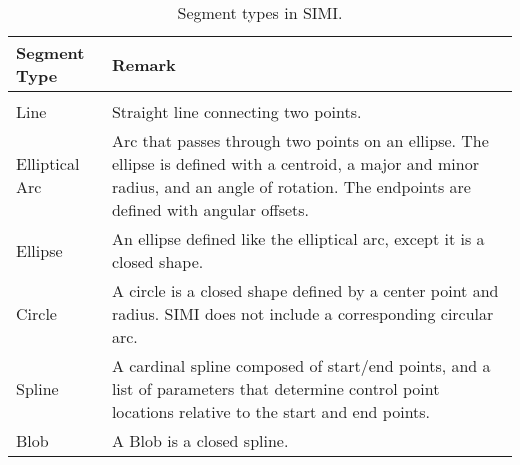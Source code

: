 
\begin{table}%
\centering
\begin{tabular}{l | p{12cm}}
\textbf{Segment Type} & \textbf{Remark} \\
\hline
\\

Line &

Straight line connecting two points.

\\

Elliptical Arc &

Arc that passes through two points on an ellipse. The ellipse is
defined with a centroid, a major and minor radius, and an angle of
rotation. The endpoints are defined with angular offsets.

\\

Ellipse &

An ellipse defined like the elliptical arc, except it is a closed
shape.  

\\ 

Circle &

A circle is a closed shape defined by a center point and radius. SIMI
does not include a corresponding circular arc.

\\ 

Spline &

A cardinal spline composed of start/end points, and a list of
parameters that determine control point locations relative to the
start and end points.

\\ 

Blob &

A Blob is a closed spline.

\\ \hline

\end{tabular}
\caption[Segment types]{Segment types in SIMI.}
\label{tab:segment-types}
\end{table}
